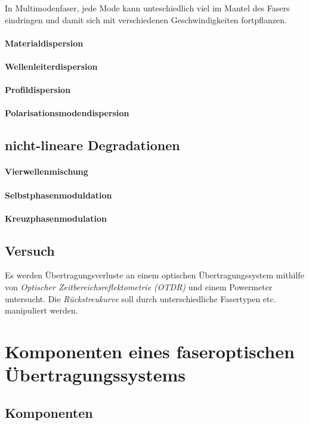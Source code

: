 \documentclass[a4paper]{article}
\begin{document}
\noindent In Multimodenfaser, jede Mode kann unteschiedlich viel im Mantel des
Fasers eindringen und damit sich mit verschiedenen Geschwindigkeiten
fortpflanzen.


\paragraph{Materialdispersion}
\paragraph{Wellenleiterdispersion}
\paragraph{Profildispersion}
\paragraph{Polarisationsmodendispersion}

\subsection{nicht-lineare Degradationen}
\paragraph{Vierwellenmischung}
\paragraph{Selbstphasenmoduldation}
\paragraph{Kreuzphasenmodulation}

\subsection{Versuch}
Es werden Übertragungsverluste an einem optischen Übertragungssystem
mithilfe von \emph{Optischer Zeitbereichsreflektometrie (OTDR)} und
einem Powermeter untersucht.
Die \emph{Rückstreukurve} soll durch unterschiedliche Fasertypen etc.
manipuliert werden.


\newpage
\section{Komponenten eines faseroptischen Übertragungssystems}
\subsection{Komponenten}
\end{document}
